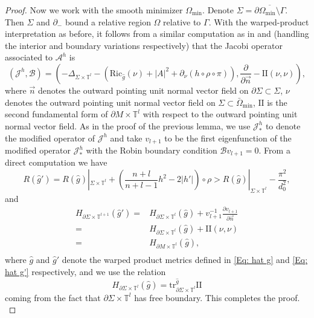 \documentclass[11pt,letterpaper]{amsart}
\numberwithin{equation}{section}
\theoremstyle{definition}
\begin{document}
\begin{proof}
{Now we work with the smooth minimizer $\Omega_{\mathrm{min}}$. Denote $\Sigma=\overline{\partial\Omega_{\mathrm{min}}\setminus\Gamma}$. Then $\Sigma$ and $\partial_-$ bound a relative region $\Omega$ relative to $\Gamma$. With the warped-product interpretation as before, it follows from a similar computation as in \cite[(1.3)]{ZZ20} and \cite[Appendix]{RS97} (handling the interior and boundary variations respectively) that the Jacobi operator associated to $\mathcal A^h$ is
$$(\mathcal J^h,\mathcal B)=\left(-\Delta_{\Sigma\times \mathbb T^l}-(\mathrm{Ric}_{\hat g}(\nu)+|A|^2+\partial_\nu(h\circ \rho\circ\pi)),\frac{\partial}{\partial \vec n}-\mathrm{II}(\nu,\nu)\right),$$
where $\vec n$ denotes the outward pointing unit normal vector field on $\partial \Sigma\subset \Sigma$, $\nu$ denotes the outward pointing unit normal vector field on $\Sigma\subset \bar\Omega_{\mathrm{min}}$, $\mathrm{II}$ is the second fundamental form of $\partial M\times \mathbb T^l$ with respect to the outward pointing unit normal vector field. As in the proof of the previous lemma, we use $\mathcal J^h_*$ to denote the modified operator of $\mathcal J^h$ and take $v_{l+1}$ to be the first eigenfunction of the modified operator $\mathcal J^h_*$ with the Robin boundary condition $\mathcal Bv_{l+1}=0$. From a direct computation we have
\begin{equation}\label{Eq: scalar change 2}
     R(\hat g')= R(\hat g)|_{\Sigma\times \mathbb T^l}+\left(\frac{n+l}{n+l-1}h^2-2|h'|\right)\circ \rho >R(\hat g)|_{\Sigma\times \mathbb T^l}-\frac{\pi^2}{d_0^2},
 \end{equation} and
 \begin{equation}\label{Eq: mean curvature change}
     \begin{split}
     H_{\partial\Sigma\times \mathbb T^{l+1}}(\hat g')= {} & H_{\partial\Sigma\times \mathbb T^l}(\hat g)+v_{l+1}^{-1}\frac{\partial v_{l+1}}{\partial \vec n} \\
     = {} & H_{\partial\Sigma\times \mathbb T^l}(\hat g)+\mathrm{II}(\nu,\nu) \\[0.6mm]
     = {} & H_{\partial M\times \mathbb T^l}(\hat g), \\
     \end{split}
 \end{equation}
where $\hat g$ and $\hat g'$ denote the warped product metrics defined in \eqref{Eq: hat g} and \eqref{Eq: hat g'} respectively, and we use the relation
$$
H_{\partial\Sigma\times \mathbb T^l}(\hat g)=\mathrm{tr}^{\hat g}_{\partial\Sigma\times \mathbb T^l}\mathrm{II}
$$
coming from the fact that $\partial\Sigma\times \mathbb T^l$ has free boundary.
This completes the proof.
}
\end{proof}
\end{document}
